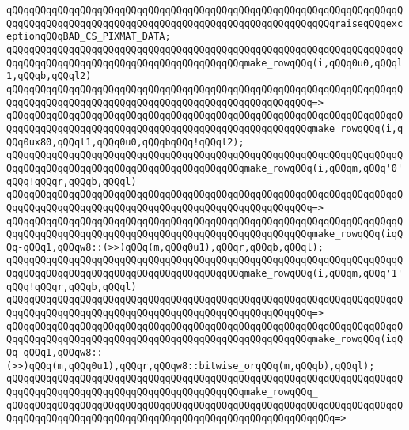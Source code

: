 \verb|qQQqqQQqqQQqqQQqqQQqqQQqqQQqqQQqqQQqqQQqqQQqqQQqqQQqqQQqqQQqqQQqqQQqqQQqqQQqqQQqqQQqqQQqqQQqqQQqqQQqqQQqqQQqqQQqqQQqqQQqqQQqqQQqraiseqQQqexceptionqQQqBAD_CS_PIXMAT_DATA;|\newline
\newline
\verb|qQQqqQQqqQQqqQQqqQQqqQQqqQQqqQQqqQQqqQQqqQQqqQQqqQQqqQQqqQQqqQQqqQQqqQQqqQQqqQQqqQQqqQQqqQQqqQQqqQQqqQQqqQQqqQQqmake_rowqQQq(i,qQQq0u0,qQQql1,qQQqb,qQQql2)|\newline
\verb|qQQqqQQqqQQqqQQqqQQqqQQqqQQqqQQqqQQqqQQqqQQqqQQqqQQqqQQqqQQqqQQqqQQqqQQqqQQqqQQqqQQqqQQqqQQqqQQqqQQqqQQqqQQqqQQqqQQqqQQqqQQq=>|\newline
\verb|qQQqqQQqqQQqqQQqqQQqqQQqqQQqqQQqqQQqqQQqqQQqqQQqqQQqqQQqqQQqqQQqqQQqqQQqqQQqqQQqqQQqqQQqqQQqqQQqqQQqqQQqqQQqqQQqqQQqqQQqqQQqmake_rowqQQq(i,qQQq0ux80,qQQql1,qQQq0u0,qQQqbqQQq!qQQql2);|\newline
\newline
\verb|qQQqqQQqqQQqqQQqqQQqqQQqqQQqqQQqqQQqqQQqqQQqqQQqqQQqqQQqqQQqqQQqqQQqqQQqqQQqqQQqqQQqqQQqqQQqqQQqqQQqqQQqqQQqqQQqmake_rowqQQq(i,qQQqm,qQQq'0'qQQq!qQQqr,qQQqb,qQQql)|\newline
\verb|qQQqqQQqqQQqqQQqqQQqqQQqqQQqqQQqqQQqqQQqqQQqqQQqqQQqqQQqqQQqqQQqqQQqqQQqqQQqqQQqqQQqqQQqqQQqqQQqqQQqqQQqqQQqqQQqqQQqqQQqqQQq=>|\newline
\verb|qQQqqQQqqQQqqQQqqQQqqQQqqQQqqQQqqQQqqQQqqQQqqQQqqQQqqQQqqQQqqQQqqQQqqQQqqQQqqQQqqQQqqQQqqQQqqQQqqQQqqQQqqQQqqQQqqQQqqQQqqQQqmake_rowqQQq(iqQQq-qQQq1,qQQqw8::(>>)qQQq(m,qQQq0u1),qQQqr,qQQqb,qQQql);|\newline
\newline
\verb|qQQqqQQqqQQqqQQqqQQqqQQqqQQqqQQqqQQqqQQqqQQqqQQqqQQqqQQqqQQqqQQqqQQqqQQqqQQqqQQqqQQqqQQqqQQqqQQqqQQqqQQqqQQqqQQqmake_rowqQQq(i,qQQqm,qQQq'1'qQQq!qQQqr,qQQqb,qQQql)|\newline
\verb|qQQqqQQqqQQqqQQqqQQqqQQqqQQqqQQqqQQqqQQqqQQqqQQqqQQqqQQqqQQqqQQqqQQqqQQqqQQqqQQqqQQqqQQqqQQqqQQqqQQqqQQqqQQqqQQqqQQqqQQqqQQq=>|\newline
\verb|qQQqqQQqqQQqqQQqqQQqqQQqqQQqqQQqqQQqqQQqqQQqqQQqqQQqqQQqqQQqqQQqqQQqqQQqqQQqqQQqqQQqqQQqqQQqqQQqqQQqqQQqqQQqqQQqqQQqqQQqqQQqmake_rowqQQq(iqQQq-qQQq1,qQQqw8::(>>)qQQq(m,qQQq0u1),qQQqr,qQQqw8::bitwise_orqQQq(m,qQQqb),qQQql);|\newline
\newline
\verb|qQQqqQQqqQQqqQQqqQQqqQQqqQQqqQQqqQQqqQQqqQQqqQQqqQQqqQQqqQQqqQQqqQQqqQQqqQQqqQQqqQQqqQQqqQQqqQQqqQQqqQQqqQQqqQQqmake_rowqQQq_|\newline
\verb|qQQqqQQqqQQqqQQqqQQqqQQqqQQqqQQqqQQqqQQqqQQqqQQqqQQqqQQqqQQqqQQqqQQqqQQqqQQqqQQqqQQqqQQqqQQqqQQqqQQqqQQqqQQqqQQqqQQqqQQqqQQqqQQq=>|\newline
